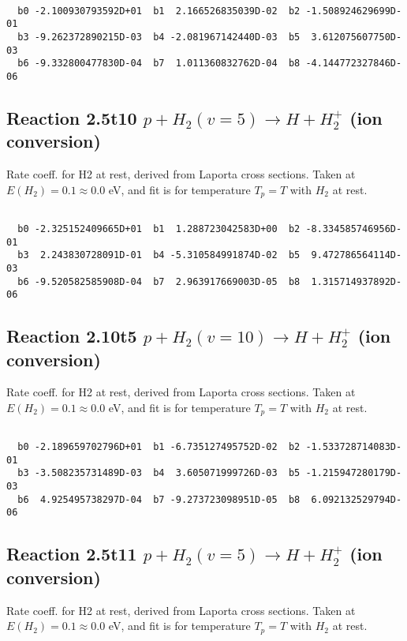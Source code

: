 \begin{small}\begin{verbatim}

  b0 -2.100930793592D+01  b1  2.166526835039D-02  b2 -1.508924629699D-01
  b3 -9.262372890215D-03  b4 -2.081967142440D-03  b5  3.612075607750D-03
  b6 -9.332800477830D-04  b7  1.011360832762D-04  b8 -4.144772327846D-06

\end{verbatim}\end{small}

\newpage
\subsection{
Reaction 2.5t10
$ p + H_2(v=5) \rightarrow H + H_2^+$ (ion conversion)
}
Rate coeff. for H2 at rest, derived from Laporta cross sections.
Taken at $E(H_2) = 0.1 \approx 0.0$ eV,  and fit is for temperature $T_p=T$ with $H_2$ at rest.

\begin{small}\begin{verbatim}

  b0 -2.325152409665D+01  b1  1.288723042583D+00  b2 -8.334585746956D-01
  b3  2.243830728091D-01  b4 -5.310584991874D-02  b5  9.472786564114D-03
  b6 -9.520582585908D-04  b7  2.963917669003D-05  b8  1.315714937892D-06

\end{verbatim}\end{small}

\newpage
\subsection{
Reaction 2.10t5
$ p + H_2(v=10) \rightarrow H + H_2^+$ (ion conversion)
}
Rate coeff. for H2 at rest, derived from Laporta cross sections.
Taken at $E(H_2) = 0.1 \approx 0.0$ eV,  and fit is for temperature $T_p=T$ with $H_2$ at rest.

\begin{small}\begin{verbatim}

  b0 -2.189659702796D+01  b1 -6.735127495752D-02  b2 -1.533728714083D-01
  b3 -3.508235731489D-03  b4  3.605071999726D-03  b5 -1.215947280179D-03
  b6  4.925495738297D-04  b7 -9.273723098951D-05  b8  6.092132529794D-06

\end{verbatim}\end{small}

\newpage
\subsection{
Reaction 2.5t11
$ p + H_2(v=5) \rightarrow H + H_2^+$ (ion conversion)
}
Rate coeff. for H2 at rest, derived from Laporta cross sections.
Taken at $E(H_2) = 0.1 \approx 0.0$ eV,  and fit is for temperature $T_p=T$ with $H_2$ at rest.

